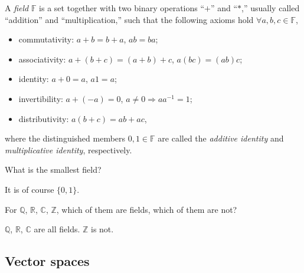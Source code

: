 
\begin{defn}
  \label{def:field}
  A \emph{field} $\mathbb{F}$ is a set together with two binary
  operations ``$+$'' and ``$*$,''
  usually called ``addition'' and ``multiplication,''
  such that 
  the following axioms hold
  \mbox{$\forall a,b,c\in\mathbb{F}$},
  \begin{itemize}\itemsep0em
  \item commutativity: $a+b=b+a$, $ab=ba$;
  \item associativity: $a+(b+c)=(a+b)+c$, $a(bc)=(ab)c$;
  \item identity: $a+0=a$, $a1=a$; %
  \item invertibility: $a+(-a)=0$, $a\ne 0 \Rightarrow a a^{-1}=1$;
  \item distributivity: $a(b+c)=ab+ac$,
  \end{itemize}
  where the distinguished members $0,1\in \mathbb{F}$ are called the
  \emph{additive identity} and \emph{multiplicative identity},
  respectively.
\end{defn}

\begin{exc}
  What is the smallest field?
\end{exc}
\begin{solution}
  It is of course $\{0,1\}$.
\end{solution}

\begin{exc}
  For $\mathbb{Q}$, $\mathbb{R}$, $\mathbb{C}$,
  $\mathbb{Z}$, 
  which of them are fields, which of them are not?
\end{exc}
\begin{solution}
  $\mathbb{Q}$, $\mathbb{R}$, $\mathbb{C}$
  are all fields.
  $\mathbb{Z}$ is not.
\end{solution}


\subsection{Vector spaces}

